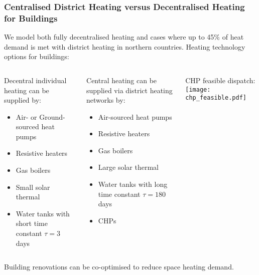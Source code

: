 \documentclass[10pt,aspectratio=169,dvipsnames]{beamer}
\let\olditem\item
\renewcommand{\item}{%
\olditem\vspace{5pt}}
\begin{document}
\begin{frame}
  \frametitle{Centralised District Heating versus Decentralised Heating for Buildings}

  We model both fully decentralised heating and cases where up to 45\%
  of heat demand is met with district heating in northern countries.
  Heating technology options for buildings:

\begin{columns}[T]
\begin{column}{5cm}
  \alert{Decentral individual heating} can be supplied by:
  \begin{itemize}
    \item Air- or Ground-sourced heat pumps
  \item Resistive heaters
  \item Gas boilers
    \item Small solar thermal
  \item Water tanks with short time constant $\tau = 3$ days
  \end{itemize}
\end{column}
\begin{column}{5cm}
  \alert{Central heating} can be supplied via district heating networks by:
  \begin{itemize}
    \item Air-sourced heat pumps
\item Resistive heaters
\item Gas boilers
        \item Large solar thermal
  \item Water tanks with long time constant $\tau = 180$ days
\item CHPs
  \end{itemize}
\end{column}

\begin{column}{5cm}
  CHP feasible dispatch:
    \texttt{[image: chp\_feasible.pdf]}
\end{column}

\end{columns}
  Building renovations can be co-optimised to reduce space heating demand.

\end{frame}
\end{document}
